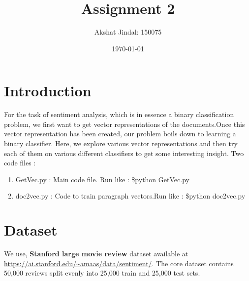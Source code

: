 \documentclass{article}
\title{Assignment 2}
\author{Akshat Jindal: 150075}
\date{\today}
\begin{document}
\maketitle

\section{Introduction}
For the task of sentiment analysis, which is in essence a binary classification problem, we first want to get vector representations of the documents.Once this vector representation has been created, our problem boils down to learning a binary classifier. Here, we explore various vector representations and then try each of them on various different classifiers to get some interesting insight. Two code files :
\begin{enumerate}
    \item GetVec.py : Main code file. Run like :  \$python GetVec.py
    \item doc2vec.py : Code to train paragraph vectors.Run like :  \$python doc2vec.py
\end{enumerate}

\section{Dataset}

We use, \textbf{Stanford large movie review} dataset available at \url{https://ai.stanford.edu/~amaas/data/sentiment/}.
The core dataset contains 50,000 reviews split evenly into 25,000 train and 25,000 test sets. 
\end{document}
